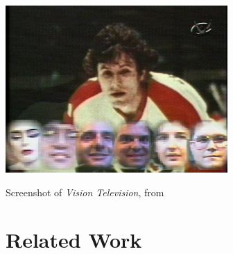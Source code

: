 % 
%


\begin{marginfigure}
	\includegraphics{figures/roar/vtv.jpeg}
	\caption{Screenshot of \emph{Vision Television}, from \citep{vt}}
	\label{fig:vtv}
\end{marginfigure}


\section{Related Work}

